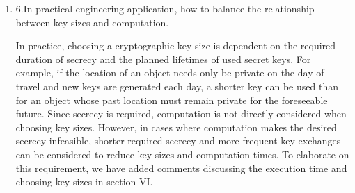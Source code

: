 \documentclass[a4paper]{scrartcl}
\newenvironment{rebuttal}{\begin{enumerate}[label={\color{grey}\thesection.\arabic{enumi}},leftmargin=0pt,ref=\thesection.\arabic{enumi}]}{\end{enumerate}}
\newcommand{\reviewtext}[1]{{\color{nblue} #1}}
\begin{document}
\begin{rebuttal}
\item \reviewtext{6.In practical engineering application, how to balance the relationship between key sizes and computation.}

In practice, choosing a cryptographic key size is dependent on the required duration of secrecy and the planned lifetimes of used secret keys. For example, if the location of an object needs only be private on the day of travel and new keys are generated each day, a shorter key can be used than for an object whose past location must remain private for the foreseeable future. Since secrecy is required, computation is not directly considered when choosing key sizes. However, in cases where computation makes the desired secrecy infeasible, shorter required secrecy and more frequent key exchanges can be considered to reduce key sizes and computation times. To elaborate on this requirement, we have added comments discussing the execution time and choosing key sizes in section VI.

\end{rebuttal}


\end{document}

